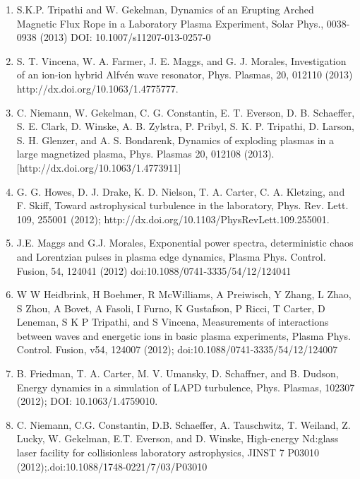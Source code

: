 \documentclass[11pt]{article}
\begin{document}
\begin{enumerate}
\item  S.K.P. Tripathi and W. Gekelman, Dynamics of an Erupting Arched Magnetic Flux Rope in a Laboratory Plasma Experiment, Solar Phys., 0038-0938 (2013) DOI: 10.1007/s11207-013-0257-0

\item   S. T. Vincena, W. A. Farmer, J. E. Maggs, and G. J. Morales, Investigation of an ion-ion hybrid Alfv\'{e}n wave resonator, Phys. Plasmas, 20, 012110 (2013) http://dx.doi.org/10.1063/1.4775777.

\item   C. Niemann, W. Gekelman, C. G. Constantin, E. T. Everson, D. B. Schaeffer, S. E. Clark, D. Winske, A. B. Zylstra, P. Pribyl, S. K. P. Tripathi, D. Larson, S. H. Glenzer, and A. S. Bondarenk, Dynamics of exploding plasmas in a large magnetized plasma, Phys. Plasmas 20, 012108 (2013). [http://dx.doi.org/10.1063/1.4773911]

\item   G. G. Howes, D. J. Drake, K. D. Nielson, T. A. Carter, C. A. Kletzing, and F. Skiff, Toward astrophysical turbulence in the laboratory, Phys. Rev. Lett. 109, 255001 (2012); http://dx.doi.org/10.1103/PhysRevLett.109.255001.

\item   J.E. Maggs and G.J. Morales, Exponential power spectra, deterministic chaos and Lorentzian pulses in plasma edge dynamics, Plasma Phys. Control. Fusion, 54, 124041 (2012) doi:10.1088/0741-3335/54/12/124041

\item W W Heidbrink, H Boehmer, R McWilliams, A Preiwisch, Y Zhang, L Zhao, S Zhou, A Bovet, A Fasoli, I Furno, K Gustafson, P Ricci, T Carter, D Leneman, S K P Tripathi, and S Vincena, Measurements of interactions between waves and energetic ions in basic plasma experiments, Plasma Phys. Control. Fusion, v54, 124007 (2012); doi:10.1088/0741-3335/54/12/124007

\item  B. Friedman, T. A. Carter, M. V. Umansky, D. Schaffner, and B. Dudson, Energy dynamics in a simulation of LAPD turbulence, Phys. Plasmas, 102307 (2012); DOI: 10.1063/1.4759010.

\item  C. Niemann, C.G. Constantin, D.B. Schaeffer, A. Tauschwitz, T. Weiland, Z. Lucky, W. Gekelman, E.T. Everson, and D. Winske, High-energy Nd:glass laser facility for collisionless laboratory astrophysics, JINST 7 P03010 (2012);.doi:10.1088/1748-0221/7/03/P03010


\end{enumerate}
\end{document}
